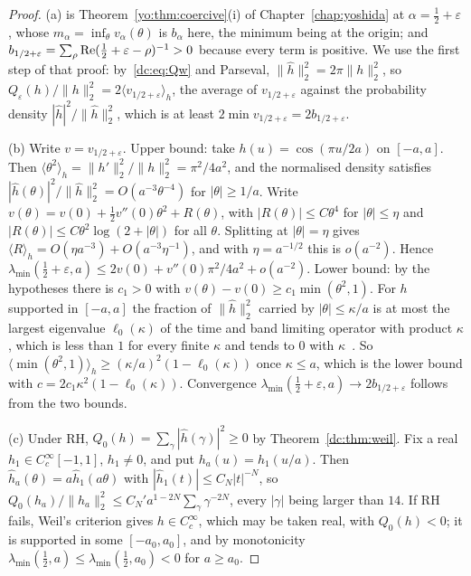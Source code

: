 \begin{proof}
(a) is Theorem~\ref{yo:thm:coercive}(i) of Chapter~\ref{chap:yoshida} at $\alpha=\frac12+\varepsilon$, whose $m_\alpha=\inf_\theta v_\alpha(\theta)$ is $b_\alpha$ here, the minimum being at the origin; and $b_{1/2+\varepsilon}=\sum_\rho\operatorname{Re}(\frac12+\varepsilon-\rho)^{-1}>0$ because every term is positive. We use the first step of that proof: by~\eqref{dc:eq:Qw} and Parseval, $\|\hat h\|_2^2=2\pi\|h\|_2^2$, so $Q_\varepsilon(h)/\|h\|_2^2=2\langle v_{1/2+\varepsilon}\rangle_h$, the average of $v_{1/2+\varepsilon}$ against the probability density $|\hat h|^2/\|\hat h\|_2^2$, which is at least $2\min v_{1/2+\varepsilon}=2b_{1/2+\varepsilon}$.

(b) Write $v=v_{1/2+\varepsilon}$. Upper bound: take $h(u)=\cos(\pi u/2a)$ on $[-a,a]$. Then $\langle\theta^2\rangle_h=\|h'\|_2^2/\|h\|_2^2=\pi^2/4a^2$, and the normalised density satisfies $|\hat h(\theta)|^2/\|\hat h\|_2^2=O(a^{-3}\theta^{-4})$ for $|\theta|\ge1/a$. Write $v(\theta)=v(0)+\frac12v''(0)\theta^2+R(\theta)$, with $|R(\theta)|\le C\theta^4$ for $|\theta|\le\eta$ and $|R(\theta)|\le C\theta^2\log(2+|\theta|)$ for all $\theta$. Splitting at $|\theta|=\eta$ gives $\langle R\rangle_h=O(\eta a^{-3})+O(a^{-3}\eta^{-1})$, and with $\eta=a^{-1/2}$ this is $o(a^{-2})$. Hence $\lambda_{\min}(\frac12+\varepsilon,a)\le2v(0)+v''(0)\pi^2/4a^2+o(a^{-2})$. Lower bound: by the hypotheses there is $c_1>0$ with $v(\theta)-v(0)\ge c_1\min(\theta^2,1)$. For $h$ supported in $[-a,a]$ the fraction of $\|\hat h\|_2^2$ carried by $|\theta|\le\kappa/a$ is at most the largest eigenvalue $\ell_0(\kappa)$ of the time and band limiting operator with product $\kappa$, which is less than $1$ for every finite $\kappa$ and tends to $0$ with $\kappa$~\cite{SlepianPollak61}. So $\langle\min(\theta^2,1)\rangle_h\ge(\kappa/a)^2(1-\ell_0(\kappa))$ once $\kappa\le a$, which is the lower bound with $c=2c_1\kappa^2(1-\ell_0(\kappa))$. Convergence $\lambda_{\min}(\frac12+\varepsilon,a)\to2b_{1/2+\varepsilon}$ follows from the two bounds.

(c) Under RH, $Q_0(h)=\sum_\gamma|\hat h(\gamma)|^2\ge0$ by Theorem~\ref{dc:thm:weil}. Fix a real $h_1\in C_c^\infty[-1,1]$, $h_1\ne0$, and put $h_a(u)=h_1(u/a)$. Then $\hat h_a(\theta)=a\hat h_1(a\theta)$ with $|\hat h_1(t)|\le C_N|t|^{-N}$, so $Q_0(h_a)/\|h_a\|_2^2\le C_N'a^{1-2N}\sum_\gamma\gamma^{-2N}$, every $|\gamma|$ being larger than $14$. If RH fails, Weil's criterion gives $h\in C_c^\infty$, which may be taken real, with $Q_0(h)<0$; it is supported in some $[-a_0,a_0]$, and by monotonicity $\lambda_{\min}(\frac12,a)\le\lambda_{\min}(\frac12,a_0)<0$ for $a\ge a_0$.
\end{proof}

